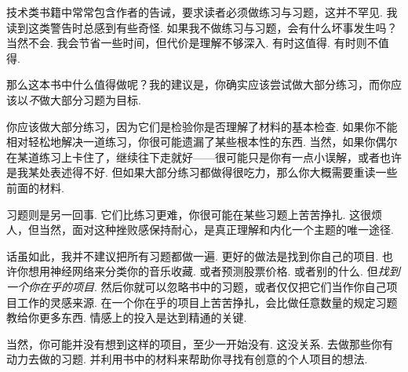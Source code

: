技术类书籍中常常包含作者的告诫，要求读者必须做练习与习题，这并不罕见. 我读到这类警告时总感到有些奇怪. 如果我不做练习与习题，会有什么坏事发生吗？当然不会. 我会节省一些时间，但代价是理解不够深入. 有时这值得. 有时则不值得.

那么这本书中什么值得做呢？我的建议是，你确实应该尝试做大部分练习，而你应该以\emph{不}做大部分习题为目标.

你应该做大部分练习，因为它们是检验你是否理解了材料的基本检查. 如果你不能相对轻松地解决一道练习，你很可能遗漏了某些根本性的东西. 当然，如果你偶尔在某道练习上卡住了，继续往下走就好——很可能只是你有一点小误解，或者也许是我某处表述得不好. 但如果大部分练习都做得很吃力，那么你大概需要重读一些前面的材料.

习题则是另一回事. 它们比练习更难，你很可能在某些习题上苦苦挣扎. 这很烦人，但当然，面对这种挫败感保持耐心，是真正理解和内化一个主题的唯一途径.

话虽如此，我并不建议把所有习题都做一遍. 更好的做法是找到你自己的项目. 也许你想用神经网络来分类你的音乐收藏. 或者预测股票价格. 或者别的什么. 但\emph{找到一个你在乎的项目}. 然后你就可以忽略书中的习题，或者仅仅把它们当作你自己项目工作的灵感来源. 在一个你在乎的项目上苦苦挣扎，会比做任意数量的规定习题教给你更多东西. 情感上的投入是达到精通的关键.

当然，你可能并没有想到这样的项目，至少一开始没有. 这没关系. 去做那些你有动力去做的习题. 并利用书中的材料来帮助你寻找有创意的个人项目的想法.
